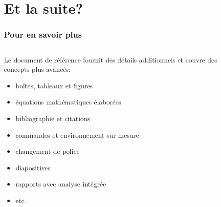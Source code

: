 
\section{Et la suite?}

\begin{frame}
  \frametitle{Pour en savoir plus}

  \begin{columns}
    \begin{column}{.6\textwidth}
      Le document de référence fournit des détails additionnels et
      couvre des concepts plus avancés:
      \begin{itemize}
        \small
      \item boîtes, tableaux et figures
      \item équations mathématiques élaborées
      \item bibliographie et citations
      \item commandes et environnement sur mesure
      \item changement de police
      \item diapositives
      \item rapports avec analyse intégrée
      \item etc.
      \end{itemize}
    \end{column}
    \begin{column}{.4\textwidth}

\end{column}
\end{columns}
\end{frame}
